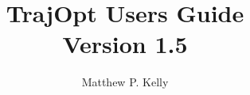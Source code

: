 \documentclass[onecolumn]{article}
\title{TrajOpt Users Guide  \\  Version 1.5}
\author{Matthew P. Kelly}
\begin{document}
\maketitle







\pagebreak
 

\end{document}
